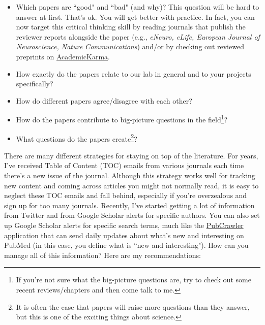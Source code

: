 \documentclass[letterpaper,12pt,oneside]{memoir}
\begin{document}
{\begin{itemize}
\item Which papers are ``good" and ``bad" (and why)? This question will be hard to answer at first. That's ok. You will get better with practice. In fact, you can now target this critical thinking skill by reading journals that publish the reviewer reports alongside the paper (e.g., \textit{eNeuro, eLife, European Journal of Neuroscience, Nature Communications}) and/or by checking out reviewed preprints on \href{http://academickarma.org/}{AcademicKarma}.
\item How exactly do the papers relate to our lab in general and to your projects specifically?
\item How do different papers agree/disagree with each other?
\item How do the papers contribute to big-picture questions in the field\footnote{If you're not sure what the big-picture questions are, try to check out some recent reviews/chapters and then come talk to me.}? 
\item What questions do the papers create\footnote{It is often the case that papers will raise more questions than they answer, but this is one of the exciting things about science.}?  
\end{itemize}

There are many different strategies for staying on top of the literature. For years, I've received Table of Content (TOC) emails from various journals each time there's a new issue of the journal. Although this strategy works well for tracking new content and coming across articles you might not normally read, it is easy to neglect these TOC emails and fall behind, especially if you're overzealous and sign up for too many journals. Recently, I've started getting a lot of information from Twitter and from Google Scholar alerts for specific authors. You can also set up Google Scholar alerts for specific search terms, much like the \href{http://pubcrawler.gen.tcd.ie/}{PubCrawler} application that can send daily updates about what's new and interesting on PubMed (in this case, you define what is ``new and interesting"). How can you manage all of this information? Here are my recommendations:

}
\end{document}
